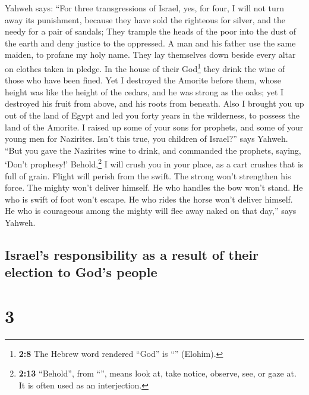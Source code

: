  Yahweh says: ``For three transgressions of Israel, yes,
for four, I will not turn away its punishment, because they have sold
the righteous for silver, and the needy for a pair of sandals;
 They trample the heads of the poor into the dust of the
earth and deny justice to the oppressed. A man and his father use the
same maiden, to profane my holy name.  They lay themselves
down beside every altar on clothes taken in pledge. In the house of
their God\footnote{\textbf{2:8} The Hebrew word rendered ``God'' is
  ``'' (Elohim).} they drink the wine of those who have
been fined.  Yet I destroyed the Amorite before them,
whose height was like the height of the cedars, and he was strong as the
oaks; yet I destroyed his fruit from above, and his roots from beneath.
 Also I brought you up out of the land of Egypt and led
you forty years in the wilderness, to possess the land of the Amorite.
 I raised up some of your sons for prophets, and some of
your young men for Nazirites. Isn't this true, you children of Israel?''
says Yahweh.  ``But you gave the Nazirites wine to drink,
and commanded the prophets, saying, `Don't prophesy!' 
Behold,\footnote{\textbf{2:13} ``Behold'', from ``'', means
  look at, take notice, observe, see, or gaze at. It is often used as an
  interjection.} I will crush you in your place, as a cart crushes that
is full of grain.  Flight will perish from the swift. The
strong won't strengthen his force. The mighty won't deliver himself.
 He who handles the bow won't stand. He who is swift of
foot won't escape. He who rides the horse won't deliver himself.
 He who is courageous among the mighty will flee away
naked on that day,'' says Yahweh.

\hypertarget{israels-responsibility-as-a-result-of-their-election-to-gods-people}{%
\subsection{Israel's responsibility as a result of their election to
God's
people}\label{israels-responsibility-as-a-result-of-their-election-to-gods-people}}

\hypertarget{section-2}{%
\section{3}\label{section-2}}


